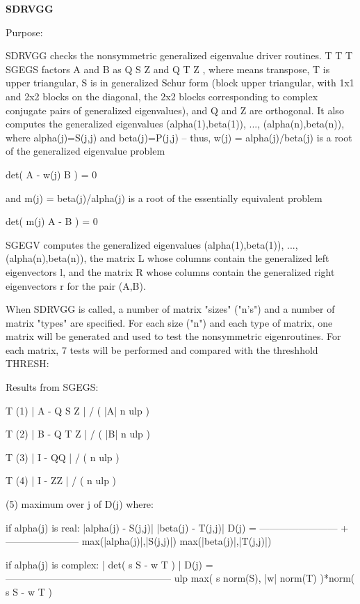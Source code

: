 {\bfseries S\+D\+R\+V\+G\+G} 

\begin{DoxyParagraph}{Purpose\+: }
\begin{DoxyVerb} SDRVGG  checks the nonsymmetric generalized eigenvalue driver
 routines.
                               T          T        T
 SGEGS factors A and B as Q S Z  and Q T Z , where   means
 transpose, T is upper triangular, S is in generalized Schur form
 (block upper triangular, with 1x1 and 2x2 blocks on the diagonal,
 the 2x2 blocks corresponding to complex conjugate pairs of
 generalized eigenvalues), and Q and Z are orthogonal.  It also
 computes the generalized eigenvalues (alpha(1),beta(1)), ...,
 (alpha(n),beta(n)), where alpha(j)=S(j,j) and beta(j)=P(j,j) --
 thus, w(j) = alpha(j)/beta(j) is a root of the generalized
 eigenvalue problem

     det( A - w(j) B ) = 0

 and m(j) = beta(j)/alpha(j) is a root of the essentially equivalent
 problem

     det( m(j) A - B ) = 0

 SGEGV computes the generalized eigenvalues (alpha(1),beta(1)), ...,
 (alpha(n),beta(n)), the matrix L whose columns contain the
 generalized left eigenvectors l, and the matrix R whose columns
 contain the generalized right eigenvectors r for the pair (A,B).

 When SDRVGG is called, a number of matrix "sizes" ("n's") and a
 number of matrix "types" are specified.  For each size ("n")
 and each type of matrix, one matrix will be generated and used
 to test the nonsymmetric eigenroutines.  For each matrix, 7
 tests will be performed and compared with the threshhold THRESH:

 Results from SGEGS:

                  T
 (1)   | A - Q S Z  | / ( |A| n ulp )

                  T
 (2)   | B - Q T Z  | / ( |B| n ulp )

               T
 (3)   | I - QQ  | / ( n ulp )

               T
 (4)   | I - ZZ  | / ( n ulp )

 (5)   maximum over j of D(j)  where:

 if alpha(j) is real:
                     |alpha(j) - S(j,j)|        |beta(j) - T(j,j)|
           D(j) = ------------------------ + -----------------------
                  max(|alpha(j)|,|S(j,j)|)   max(|beta(j)|,|T(j,j)|)

 if alpha(j) is complex:
                                 | det( s S - w T ) |
           D(j) = ---------------------------------------------------
                  ulp max( s norm(S), |w| norm(T) )*norm( s S - w T )


\end{DoxyVerb}
\end{DoxyParagraph}
